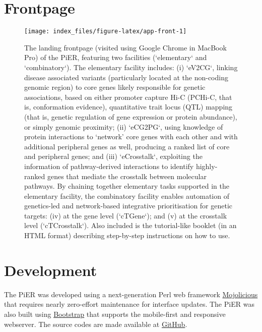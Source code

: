 \documentclass[
  oneside]{book}
\begin{document}
\hypertarget{frontpage}{%
\chapter{Frontpage}\label{frontpage}}

\begin{figure}

{\centering \texttt{[image: index\_files/figure-latex/app-front-1]} 

}

\caption{The landing frontpage (visited using Google Chrome in MacBook Pro) of the PiER, featuring two facilities (`elementary` and `combinatory`). The elementary facility includes: (i) `eV2CG`, linking disease associated variants (particularly located at the non-coding genomic region) to core genes likely responsible for genetic associations, based on either promoter capture Hi-C (PCHi-C, that is, conformation evidence), quantitative trait locus (QTL) mapping (that is, genetic regulation of gene expression or protein abundance), or simply genomic proximity; (ii) `eCG2PG`, using knowledge of protein interactions to ‘network’ core genes with each other and with additional peripheral genes as well, producing a ranked list of core and peripheral genes; and (iii) `eCrosstalk`, exploiting the information of pathway-derived interactions to identify highly-ranked genes that mediate the crosstalk between molecular pathways. By chaining together elementary tasks supported in the elementary facility, the combinatory facility enables automation of genetics-led and network-based integrative prioritisation for genetic targets: (iv) at the gene level (`cTGene`); and (v) at the crosstalk level (`cTCrosstalk`). Also included is the tutorial-like booklet (in an HTML format) describing step-by-step instructions on how to use.}\label{fig:app-front}
\end{figure}

\hypertarget{development}{%
\chapter{Development}\label{development}}

The PiER was developed using a next-generation Perl web framework \href{https://www.mojolicious.org}{Mojolicious} that requires nearly zero-effort maintenance for interface updates. The PiER was also built using \href{https://getbootstrap.com}{Bootstrap} that supports the mobile-first and responsive webserver. The source codes are made available at \href{https://github.com/23verse/pier}{GitHub}.
\end{document}
